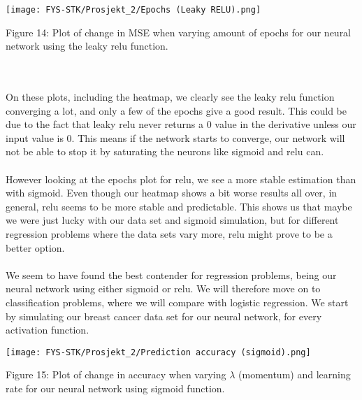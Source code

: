 \documentclass[english,notitlepage,reprint,nofootinbib]{revtex4-1}  %
\begin{document}
\texttt{[image: FYS-STK/Prosjekt\_2/Epochs (Leaky RELU).png]}
\caption{Figure 14: Plot of change in MSE when varying amount of epochs for our neural network using the leaky relu function.}
\\
\\
On these plots, including the heatmap, we clearly see the leaky relu function converging a lot, and only a few of the epochs give a good result. This could be due to the fact that leaky relu never returns a $0$ value in the derivative unless our input value is $0$. This means if the network starts to converge, our network will not be able to stop it by saturating the neurons like sigmoid and relu can. 
\\
\\
However looking at the epochs plot for relu, we see a more stable estimation than with sigmoid. Even though our heatmap shows a bit worse results all over, in general, relu seems to be more stable and predictable. This shows us that maybe we were just lucky with our data set and sigmoid simulation, but for different regression problems where the data sets vary more, relu might prove to be a better option. 
\\
\\
We seem to have found the best contender for regression problems, being our neural network using either sigmoid or relu. We will therefore move on to classification problems, where we will compare with logistic regression. We start by simulating our breast cancer data set for our neural network, for every activation function.

\texttt{[image: FYS-STK/Prosjekt\_2/Prediction accuracy (sigmoid).png]}
\caption{Figure 15: Plot of change in accuracy when varying $\lambda$ (momentum) and learning rate for our neural network using sigmoid function.}
\end{document}
